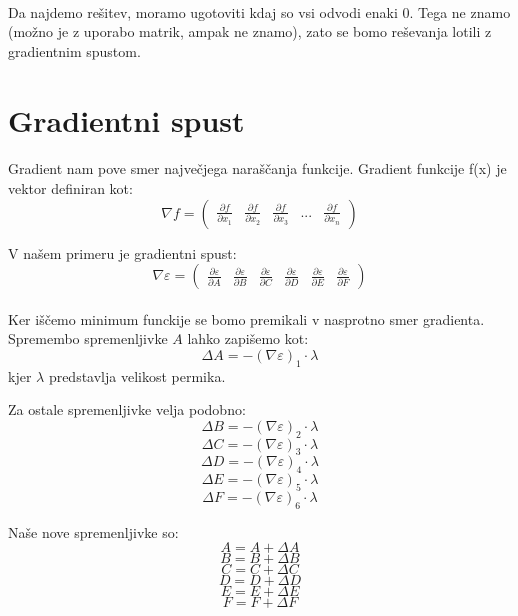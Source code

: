 \documentclass[a4paper, 12pt]{article}
\begin{document}
	\paragraph{}
	Da najdemo rešitev, moramo ugotoviti kdaj so vsi odvodi enaki 0. Tega ne znamo (možno je z uporabo matrik, ampak ne znamo), zato se bomo reševanja lotili z gradientnim spustom.

	\section*{Gradientni spust}
	\paragraph{}
	Gradient nam pove smer največjega naraščanja funkcije. Gradient funkcije f(x) je vektor definiran kot:
	$$\nabla f = \begin{pmatrix}\frac{\partial f}{\partial x_{1}} & \frac{\partial f}{\partial x_{2}} & \frac{\partial f}{\partial x_{3}} & ... & \frac{\partial f}{\partial x_{n}}\end{pmatrix}$$

	V našem primeru je gradientni spust:
	$$\nabla \varepsilon =
	\begin{pmatrix}
	\frac{\partial \varepsilon}{\partial A} &
	\frac{\partial \varepsilon}{\partial B} &
	\frac{\partial \varepsilon}{\partial C} &
	\frac{\partial \varepsilon}{\partial D} &
	\frac{\partial \varepsilon}{\partial E} &
	\frac{\partial \varepsilon}{\partial F}
	\end{pmatrix}$$

	\paragraph{}
	Ker iščemo minimum funckije se bomo premikali v nasprotno smer gradienta. Spremembo spremenljivke $A$ lahko zapišemo kot:
	$$\Delta A = -(\nabla \varepsilon)_1 \cdot \lambda$$
	kjer $\lambda$ predstavlja velikost permika.

	Za ostale spremenljivke velja podobno:
	$$\Delta B = -(\nabla \varepsilon)_2 \cdot \lambda$$
	$$\Delta C = -(\nabla \varepsilon)_3 \cdot \lambda$$
	$$\Delta D = -(\nabla \varepsilon)_4 \cdot \lambda$$
	$$\Delta E = -(\nabla \varepsilon)_5 \cdot \lambda$$
	$$\Delta F = -(\nabla \varepsilon)_6 \cdot \lambda$$

	Naše nove spremenljivke so:
	$$ A = A + \Delta A$$
	$$ B = B + \Delta B$$
	$$ C = C + \Delta C$$
	$$ D = D + \Delta D$$
	$$ E = E + \Delta E$$
	$$ F = F + \Delta F$$
\end{document}
